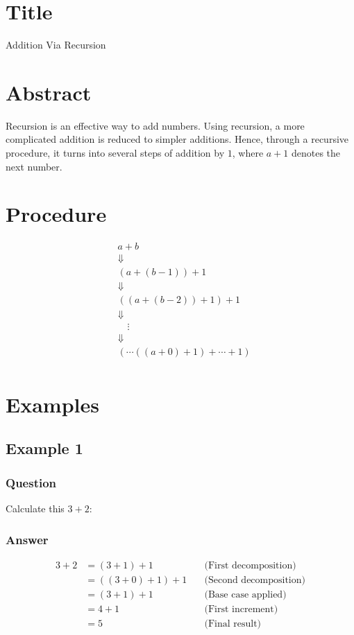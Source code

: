 \documentclass{article}
\begin{document}
\section{Title}
Addition Via Recursion

\section{Abstract}
Recursion is an effective way to add numbers. Using recursion, a more complicated addition is reduced to simpler additions. Hence, through a recursive procedure, it turns into several steps of addition by $1$, where $a+1$ denotes the next number.
\section{Procedure}
\[
    \begin{aligned}
         & a + b                              \\
         & \Downarrow                         \\
         & (a + (b-1)) + 1                    \\
         & \Downarrow                         \\
         & ((a + (b-2)) + 1) + 1              \\
         & \Downarrow                         \\
         & \quad \vdots                       \\
         & \Downarrow                         \\
         & (\cdots((a + 0) + 1) + \cdots + 1) \\
    \end{aligned}
\]
\section{Examples}
\subsection{Example 1}
\subsubsection{Question}
Calculate this \(3 + 2\):
\subsubsection{Answer}
\[
    \begin{aligned}
        3 + 2 & = (3 + 1) + 1 \quad       & \text{(First decomposition)}  \\
              & = ((3 + 0) + 1) + 1 \quad & \text{(Second decomposition)} \\
              & = (3 + 1) + 1 \quad       & \text{(Base case applied)}    \\
              & = 4 + 1 \quad             & \text{(First increment)}      \\
              & = 5 \quad                 & \text{(Final result)}
    \end{aligned}
\]
\end{document}
